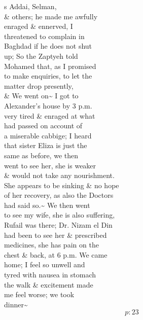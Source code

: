 \documentclass{report}
\begin{document}
	\par{
 	s Addai, Selman,\ \\\& others; he made me awfully\ \\enraged \& ennerved, I\ \\threatened to complain in\ \\Baghdad if he does not shut\ \\up; So the Zaptyeh told\ \\Mohamed that, as I promised\ \\to make enquiries, to let the\ \\matter drop presently,\ \\\& We went on\~{} I got to\ \\Alexander's house by 3 p.m.\ \\very tired \& enraged at what\ \\had passed on account of\ \\a miserable cabbige; I heard\ \\that sister Eliza is just the\ \\same as before, we then\ \\went to see her, she is weaker\ \\\& would not take any nourishment.\ \\She appears to be sinking \& no hope\ \\of her recovery, as also the Doctors\ \\had said so.\~{} We then went\ \\to see my wife, she is also suffering,\ \\Rufail was there; Dr. Nizam el Din\ \\had been to see her \& prescribed\ \\medicines, she has pain on the\ \\chest \& back, at 6 p.m. We came\ \\home; I feel so unwell and\ \\tyred with nausea in stomach\ \\the walk \& excitement made\ \\me feel worse; we took\ \\dinner\~{}\ \\
  \[p: 23 \]

	}




\end{document}
